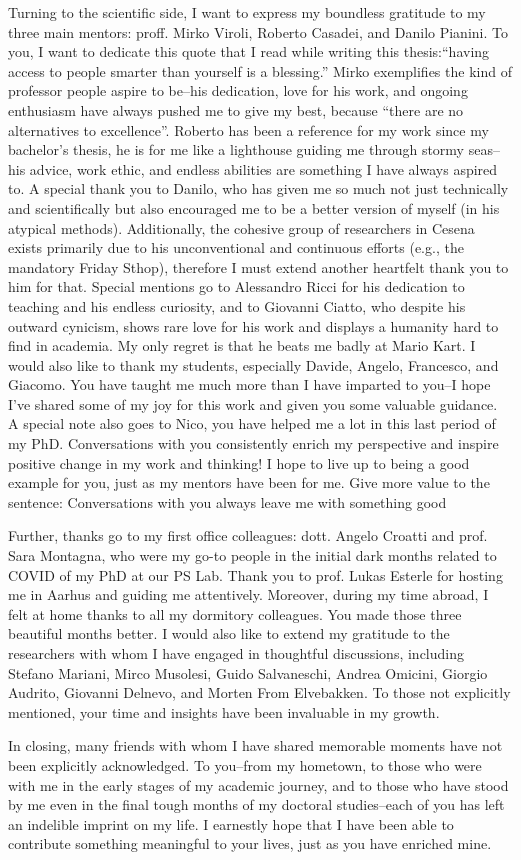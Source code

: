 Turning to the scientific side, 
 I want to express my boundless gratitude to my three main mentors: proff. Mirko Viroli, Roberto Casadei, and Danilo Pianini. 
 To you, I want to dedicate this quote that I read while writing this thesis:``having access to people smarter than yourself is a blessing.'' 
% 
Mirko exemplifies the kind of professor people aspire to be--his dedication, love for his work, 
 and ongoing enthusiasm have always pushed me to give my best, because ``there are no alternatives to excellence''. 
 Roberto has been a reference for my work since my bachelor's thesis, 
 he is for me like a lighthouse guiding me through stormy seas--his advice, work ethic, and endless abilities are something I have always aspired to. 
 A special thank you to Danilo, 
 who has given me so much not just technically and scientifically 
 but also encouraged me to be a better version of myself (in his atypical methods).
 Additionally, the cohesive group of researchers in Cesena exists primarily due to his unconventional and continuous efforts (e.g., the mandatory Friday Sthop), therefore I must extend another heartfelt thank you to him for that.
%
Special mentions go to Alessandro Ricci for his dedication to teaching and his endless curiosity, 
 and to Giovanni Ciatto, who despite his outward cynicism, shows rare love for his work and displays a humanity hard to find in academia. 
 My only regret is that he beats me badly at Mario Kart.
%
I would also like to thank my students, especially Davide, Angelo, Francesco, and Giacomo. 
 You have taught me much more than I have imparted to you--I hope I've shared some of my joy for this work and given you some valuable guidance.
%
A special note also goes to Nico, you have helped me a lot in this last period of my PhD.
Conversations with you consistently enrich my perspective and inspire positive change in my work and thinking! 
I hope to live up to being a good example for you, just as my mentors have been for me.
Give more value to the sentence: Conversations with you always leave me with something good

Further, thanks go to my first office colleagues: dott. Angelo Croatti and prof. Sara Montagna, who were my go-to people in the initial dark months related to COVID of my PhD at our PS Lab.
%
Thank you to prof. Lukas Esterle for hosting me in Aarhus and guiding me attentively. 
Moreover, during my time abroad, I felt at home thanks to all my dormitory colleagues. 
You made those three beautiful months better.
%
I would also like to extend my gratitude to the researchers with whom I have engaged in thoughtful discussions, including Stefano Mariani, Mirco Musolesi, Guido Salvaneschi, Andrea Omicini, Giorgio Audrito, Giovanni Delnevo, and Morten From Elvebakken. To those not explicitly mentioned, your time and insights have been invaluable in my growth.

In closing, 
 many friends with whom I have shared memorable moments have not been explicitly acknowledged. 
 To you--from my hometown, to those who were with me in the early stages of my academic journey, and to those who have stood by me even in the final tough months of my doctoral studies--each of you has left an indelible imprint on my life. 
 I earnestly hope that I have been able to contribute something meaningful to your lives, just as you have enriched mine.